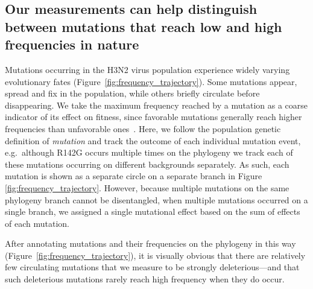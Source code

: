 \subsection{Our measurements can help distinguish between mutations that reach low and high frequencies in nature}
Mutations occurring in the H3N2 virus population experience widely varying evolutionary fates (Figure~\ref{fig:frequency_trajectory}).
Some mutations appear, spread and fix in the population, while others briefly circulate before disappearing.
We take the maximum frequency reached by a mutation as a coarse indicator of its effect on fitness, since favorable mutations generally reach higher frequencies than unfavorable ones~\citep{ewens2012mathematical}.
Here, we follow the population genetic definition of \textit{mutation} and track the outcome of each individual mutation event, e.g.\ although R142G occurs multiple times on the phylogeny we track each of these mutations occurring on different backgrounds separately.
As such, each mutation is shown as a separate circle on a separate branch in Figure \ref{fig:frequency_trajectory}.
However, because multiple mutations on the same phylogeny branch cannot be disentangled, when multiple mutations occurred on a single branch, we assigned a single mutational effect based on the sum of effects of each mutation.

After annotating mutations and their frequencies on the phylogeny in this way (Figure~\ref{fig:frequency_trajectory}), it is visually obvious that there are relatively few circulating mutations that we measure to be strongly deleterious---and that such deleterious mutations rarely reach high frequency when they do occur.

